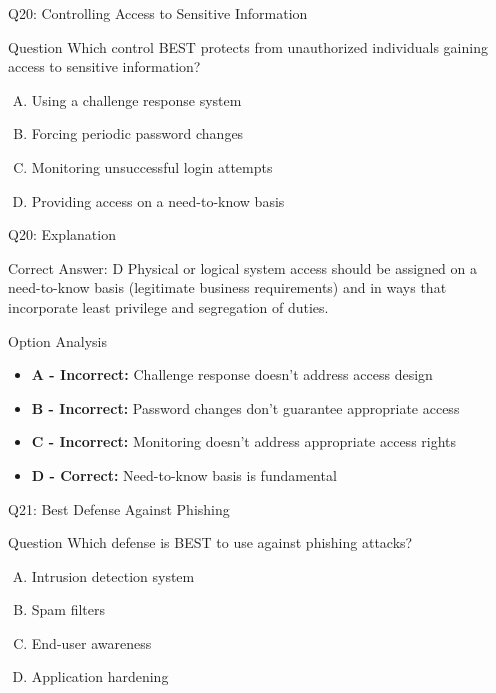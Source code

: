 \documentclass{beamer}
\begin{document}
	\begin{frame}{Q20: Controlling Access to Sensitive Information}
		\begin{block}{Question}
			Which control BEST protects from unauthorized individuals gaining access to sensitive information?
		\end{block}
		\begin{enumerate}[(A)]
			\item Using a challenge response system
			\item Forcing periodic password changes
			\item Monitoring unsuccessful login attempts
			\item Providing access on a need-to-know basis
		\end{enumerate}
	\end{frame}
	
	\begin{frame}{Q20: Explanation}
		\begin{block}{Correct Answer: D}
			Physical or logical system access should be assigned on a need-to-know basis (legitimate business requirements) and in ways that incorporate least privilege and segregation of duties.
		\end{block}
		\begin{block}{Option Analysis}
			\begin{itemize}
				\item \textbf{A - Incorrect:} Challenge response doesn't address access design
				\item \textbf{B - Incorrect:} Password changes don't guarantee appropriate access
				\item \textbf{C - Incorrect:} Monitoring doesn't address appropriate access rights
				\item \textbf{D - Correct:} Need-to-know basis is fundamental
			\end{itemize}
		\end{block}
	\end{frame}
	
	\begin{frame}{Q21: Best Defense Against Phishing}
		\begin{block}{Question}
			Which defense is BEST to use against phishing attacks?
		\end{block}
		\begin{enumerate}[(A)]
			\item Intrusion detection system
			\item Spam filters
			\item End-user awareness
			\item Application hardening
		\end{enumerate}
	\end{frame}
	
\end{document}
